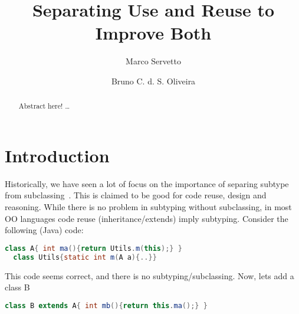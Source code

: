\documentclass{llncs}
\begin{document}
%
\frontmatter          %
%
\pagestyle{headings}  %
%

\title{Separating Use and Reuse to Improve Both}
%

\author{Marco Servetto \and Bruno C. d. S. Oliveira}
%
%
%

\maketitle              %

\begin{abstract}
Abstract here!
\dots
{}
\end{abstract}

\section{Introduction}

Historically, we have seen a lot of focus on the importance of
separing subtype from subclassing~\cite{cook}.  This is claimed to be
good for code reuse, design and reasoning.  While there is no problem
in subtyping without subclassing, in most OO languages code reuse
(inheritance/extends) imply subtyping.  Consider the following (Java)
code:

\begin{lstlisting}[language=Java]
  class A{ int ma(){return Utils.m(this);} }
  class Utils{static int m(A a){..}}
\end{lstlisting}

This code seems correct, and there is no subtyping/subclassing.
Now, lets add a class B

\begin{lstlisting}[language=Java]
  class B extends A{ int mb(){return this.ma();} }
\end{lstlisting}
\end{document}
